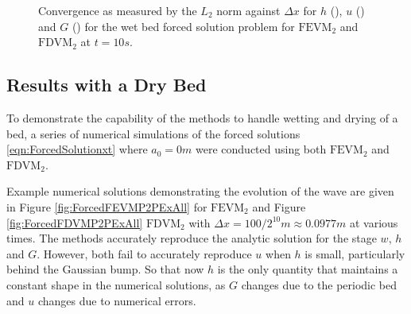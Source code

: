 \begin{figure}
\begin{subfigure}{0.5\textwidth}
	\end{subfigure}
	\caption{Convergence as measured by the $L_2$ norm against $\Delta x$ for $h$ (), $u$ () and $G$ () for the wet bed forced solution problem for $\text{FEVM}_2$ and $\text{FDVM}_2$ at $t=10s$.}
	\label{fig:L1convergenceforcedWet}
\end{figure}


\subsection{Results with a Dry Bed} 
To demonstrate the capability of the methods to handle wetting and drying of a bed, a series of numerical simulations of the forced solutions \eqref{eqn:ForcedSolutionxt} where $a_0 = 0m$ were conducted using both $\text{FEVM}_2$ and $\text{FDVM}_2$. 

Example numerical solutions demonstrating the evolution of the wave are given in Figure \ref{fig:ForcedFEVMP2PExAll} for $\text{FEVM}_2$ and Figure \ref{fig:ForcedFDVMP2PExAll} $\text{FDVM}_2$ with $\Delta x = 100/ 2^{10} m \approx 0.0977m$ at various times. The methods accurately reproduce the analytic solution for the stage $w$, $h$ and $G$. However, both fail to accurately reproduce $u$ when $h$ is small, particularly behind the Gaussian bump. So that now $h$ is the only quantity that maintains a constant shape in the numerical solutions, as $G$ changes due to the periodic bed and $u$ changes due to numerical errors. 

